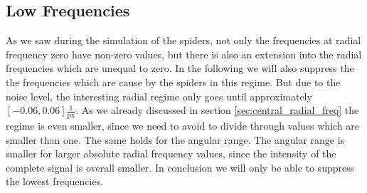 \subsection{Low Frequencies}
As we saw during the simulation of the spiders, not only the frequencies at radial frequency zero have non-zero values, but there is also an extension into the radial frequencies which are unequal to zero. In the following we will also suppress the the frequencies which are cause by the spiders in this regime. But due to the noise level, the interesting radial regime only goes until approximately $[-0.06, 0.06] \frac{1}{\mathrm{px}}$. As we already discussed in section \ref{sec:central_radial_freq} the regime is even smaller, since we need to avoid to divide through values which are smaller than one. The same holds for the angular range. The angular range is smaller for larger absolute radial frequency values, since the intensity of the complete signal is overall smaller. In conclusion we will only be able to suppress the lowest frequencies.\\

